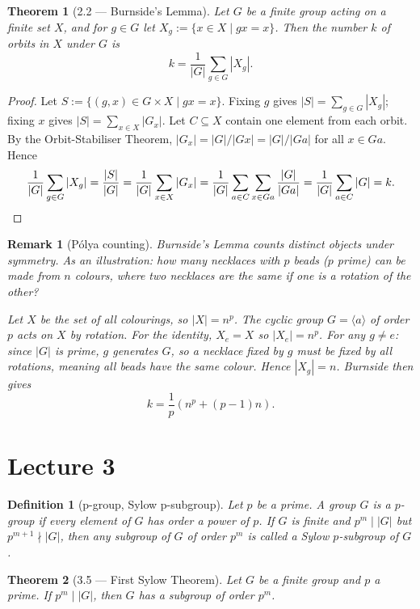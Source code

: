 \documentclass[12pt]{article}
\newtheorem{theorem}{Theorem}
\newtheorem{definition}{Definition}
\newtheorem{remark}{Remark}
\begin{document}
\begin{theorem}[2.2 — Burnside's Lemma]
Let $G$ be a finite group acting on a finite set $X$, and for $g \in G$ let $X_g := \{x \in X \mid gx = x\}$. Then the number $k$ of orbits in $X$ under $G$ is
\[
  k = \frac{1}{|G|} \sum_{g \in G} |X_g|.
\]
\end{theorem}

\begin{proof}
Let $S := \{(g, x) \in G \times X \mid gx = x\}$. Fixing $g$ gives $|S| = \sum_{g \in G}|X_g|$; fixing $x$ gives $|S| = \sum_{x \in X}|G_x|$. Let $C \subseteq X$ contain one element from each orbit. By the Orbit-Stabiliser Theorem, $|G_x| = |G|/|Gx| = |G|/|Ga|$ for all $x \in Ga$. Hence
\[
  \frac{1}{|G|}\sum_{g \in G}|X_g|
  = \frac{|S|}{|G|}
  = \frac{1}{|G|}\sum_{x \in X}|G_x|
  = \frac{1}{|G|}\sum_{a \in C}\sum_{x \in Ga}\frac{|G|}{|Ga|}
  = \frac{1}{|G|}\sum_{a \in C}|G|
  = k. \qedhere
\]
\end{proof}


\begin{remark}[Pólya counting]
Burnside's Lemma counts distinct objects under symmetry. As an illustration: how many necklaces with $p$ beads ($p$ prime) can be made from $n$ colours, where two necklaces are the same if one is a rotation of the other?

Let $X$ be the set of all colourings, so $|X| = n^p$. The cyclic group $G = \langle a \rangle$ of order $p$ acts on $X$ by rotation. For the identity, $X_e = X$ so $|X_e| = n^p$. For any $g \neq e$: since $|G|$ is prime, $g$ generates $G$, so a necklace fixed by $g$ must be fixed by all rotations, meaning all beads have the same colour. Hence $|X_g| = n$. Burnside then gives
\[
  k = \frac{1}{p}\left(n^p + (p-1)n\right).
\]
\end{remark}


\section*{Lecture 3}

\begin{definition}[p-group, Sylow p-subgroup]
Let $p$ be a prime. A group $G$ is a \emph{$p$-group} if every element of $G$ has order a power of $p$. If $G$ is finite and $p^m \mid |G|$ but $p^{m+1} \nmid |G|$, then any subgroup of $G$ of order $p^m$ is called a \emph{Sylow $p$-subgroup} of $G$.
\end{definition}

\begin{theorem}[3.5 — First Sylow Theorem]
Let $G$ be a finite group and $p$ a prime. If $p^m \mid |G|$, then $G$ has a subgroup of order $p^m$.
\end{theorem}
\end{document}
